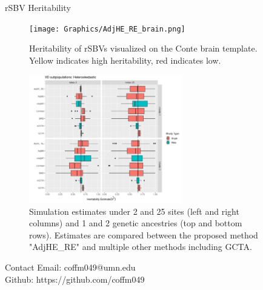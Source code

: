 \documentclass[final]{beamer}
\newlength{\sepwid}
\newlength{\onecolwid}
\newlength{\twocolwid}
\begin{document}
\begin{frame}[t]
\begin{columns}[t]
\begin{column}{\onecolwid}
\end{column} %
\begin{column}{\sepwid}\end{column} %
\begin{column}{\twocolwid} %
\begin{alertblock}{rSBV Heritability}
\begin{figure}
\texttt{[image: Graphics/AdjHE\_RE\_brain.png]}
\caption{Heritability of rSBVs visualized on the Conte brain template. Yellow indicates high heritability, red indicates low.}
\label{fig:brain}
\end{figure}
\end{alertblock}
\vspace{2cm}
\begin{figure}
    \includegraphics[width=0.66\textwidth]{Graphics/Adding_sites_n_clusts_het.png}
    \caption{\centering
       Simulation estimates under 2 and 25 sites (left and right columns) and 1 and 2 genetic ancestries (top and bottom rows). Estimates are compared between the proposed method "AdjHE\_RE" and multiple other methods including GCTA.
    } \label{fig:03-03}
\end{figure}

\begin{alertblock}{Contact}
Email: coffm049@umn.edu \\
Github: https://github.com/coffm049
\end{alertblock}



\end{column}
\end{columns}
\end{frame}
\end{document}
